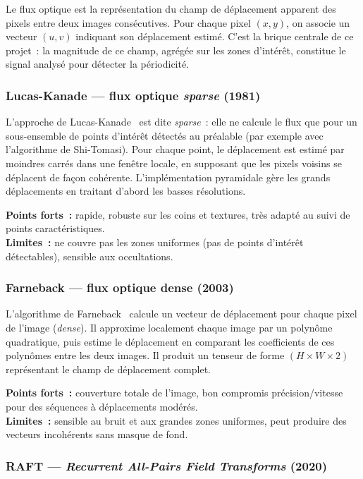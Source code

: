 Le flux optique est la représentation du champ de déplacement apparent des pixels entre deux images consécutives. Pour chaque pixel $(x, y)$, on associe un vecteur $(u, v)$ indiquant son déplacement estimé. C'est la brique centrale de ce projet~: la magnitude de ce champ, agrégée sur les zones d'intérêt, constitue le signal analysé pour détecter la périodicité.

\subsubsection{Lucas-Kanade --- flux optique \textit{sparse} (1981)}

L'approche de Lucas-Kanade~\cite{lucas1981iterative} est dite \textit{sparse}~: elle ne calcule le flux que pour un sous-ensemble de points d'intérêt détectés au préalable (par exemple avec l'algorithme de Shi-Tomasi). Pour chaque point, le déplacement est estimé par moindres carrés dans une fenêtre locale, en supposant que les pixels voisins se déplacent de façon cohérente. L'implémentation pyramidale gère les grands déplacements en traitant d'abord les basses résolutions.

\medskip
\noindent\textbf{Points forts~:} rapide, robuste sur les coins et textures, très adapté au suivi de points caractéristiques.\\
\textbf{Limites~:} ne couvre pas les zones uniformes (pas de points d'intérêt détectables), sensible aux occultations.

\subsubsection{Farneback --- flux optique dense (2003)}

L'algorithme de Farneback~\cite{farneback2003two} calcule un vecteur de déplacement pour chaque pixel de l'image (\textit{dense}). Il approxime localement chaque image par un polynôme quadratique, puis estime le déplacement en comparant les coefficients de ces polynômes entre les deux images. Il produit un tenseur de forme $(H \times W \times 2)$ représentant le champ de déplacement complet.

\medskip
\noindent\textbf{Points forts~:} couverture totale de l'image, bon compromis précision/vitesse pour des séquences à déplacements modérés.\\
\textbf{Limites~:} sensible au bruit et aux grandes zones uniformes, peut produire des vecteurs incohérents sans masque de fond.

\subsubsection{RAFT --- \textit{Recurrent All-Pairs Field Transforms} (2020)}

